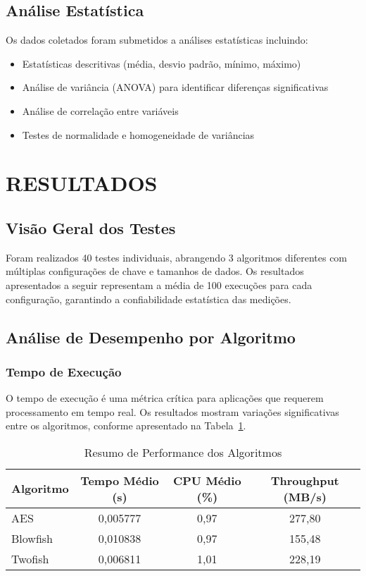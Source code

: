 \documentclass[12pt,a4paper,oneside]{article}
\begin{document}
\subsection{Análise Estatística}

Os dados coletados foram submetidos a análises estatísticas incluindo:

\begin{itemize}
    \item Estatísticas descritivas (média, desvio padrão, mínimo, máximo)
    \item Análise de variância (ANOVA) para identificar diferenças significativas
    \item Análise de correlação entre variáveis
    \item Testes de normalidade e homogeneidade de variâncias
\end{itemize}

\section{RESULTADOS}

\subsection{Visão Geral dos Testes}

Foram realizados 40 testes individuais, abrangendo 3 algoritmos diferentes com múltiplas configurações de chave e tamanhos de dados. Os resultados apresentados a seguir representam a média de 100 execuções para cada configuração, garantindo a confiabilidade estatística das medições.

\subsection{Análise de Desempenho por Algoritmo}

\subsubsection{Tempo de Execução}

O tempo de execução é uma métrica crítica para aplicações que requerem processamento em tempo real. Os resultados mostram variações significativas entre os algoritmos, conforme apresentado na Tabela~\ref{tab:performance}.

\begin{table}[H]
\centering
\caption{Resumo de Performance dos Algoritmos}
\label{tab:performance}
\begin{tabular}{lccc}
\toprule
\textbf{Algoritmo} & \textbf{Tempo Médio (s)} & \textbf{CPU Médio (\%)} & \textbf{Throughput (MB/s)} \\
\midrule
AES & 0,005777 & 0,97 & 277,80 \\
Blowfish & 0,010838 & 0,97 & 155,48 \\
Twofish & 0,006811 & 1,01 & 228,19 \\
\bottomrule
\end{tabular}
\end{table}
\end{document}
